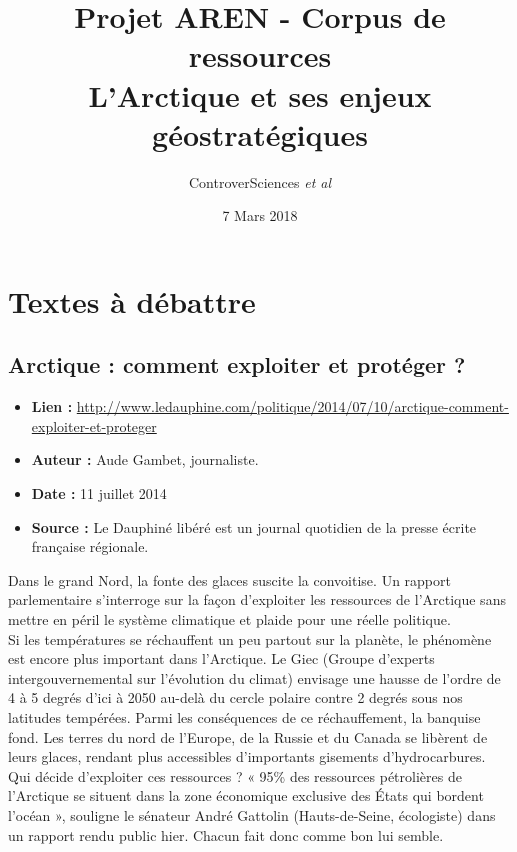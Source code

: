 \documentclass[8pt]{article}
\author{ControverSciences\textit{ et al} }
\title{Projet AREN - Corpus de ressources \\ L’Arctique et ses enjeux géostratégiques}
\date{7 Mars 2018}
\begin{document}
\maketitle

\tableofcontents

\newpage
\section{Textes à débattre}

\subsection{ Arctique : comment exploiter et protéger ? }

\begin{itemize}
	\item \textbf{Lien : }  \url{http://www.ledauphine.com/politique/2014/07/10/arctique-comment-exploiter-et-proteger} 
	\item \textbf{Auteur : }  Aude Gambet, journaliste.
	\item \textbf{Date : } 11 juillet 2014
	\item \textbf{Source : } Le Dauphiné libéré est un journal quotidien de la presse écrite française régionale.
\end{itemize}

Dans le grand Nord, la fonte des glaces suscite la convoitise. Un rapport parlementaire s’interroge sur la façon d’exploiter les ressources de l’Arctique sans mettre en péril le système climatique et plaide pour une réelle politique.\\

Si les températures se réchauffent un peu partout sur la planète, le phénomène est encore plus important dans l’Arctique. Le Giec (Groupe d’experts intergouvernemental sur l’évolution du climat) envisage une hausse de l’ordre de 4 à 5 degrés d’ici à 2050 au-delà du cercle polaire contre 2 degrés sous nos latitudes tempérées. Parmi les conséquences de ce réchauffement, la banquise fond. Les terres du nord de l’Europe, de la Russie et du Canada se libèrent de leurs glaces, rendant plus accessibles d’importants gisements d’hydrocarbures.\\

Qui décide d’exploiter ces ressources ? « 95\% des ressources pétrolières de l’Arctique se situent dans la zone économique exclusive des États qui bordent l’océan », souligne le sénateur André Gattolin (Hauts-de-Seine, écologiste) dans un rapport rendu public hier. Chacun fait donc comme bon lui semble.\\
\end{document}
